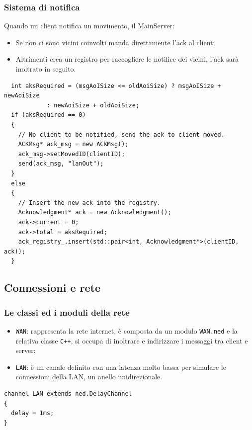 \begin{frame}[fragile]
\frametitle{Sistema di notifica}
\begin{block}{Quando un client notifica un movimento, il MainServer:}
\begin{itemize}
\item
Se non ci sono vicini coinvolti manda direttamente l'ack al client;
\item
Altrimenti crea un registro per raccogliere le notifice dei vicini, l'ack
sarà inoltrato in seguito.
\end{itemize}
\end{block}

\begin{lstlisting}
  int aksRequired = (msgAoISize <= oldAoiSize) ? msgAoISize + newAoiSize
            : newAoiSize + oldAoiSize;
  if (aksRequired == 0)
  {
    // No client to be notified, send the ack to client moved.
    ACKMsg* ack_msg = new ACKMsg();
    ack_msg->setMovedID(clientID);
    send(ack_msg, "lanOut");
  }
  else
  {
    // Insert the new ack into the registry.
    Acknowledgment* ack = new Acknowledgment();
    ack->current = 0;
    ack->total = aksRequired;
    ack_registry_.insert(std::pair<int, Acknowledgment*>(clientID, ack));
  }
\end{lstlisting}
\end{frame}


\subsection*{Connessioni e rete}

\begin{frame}[fragile]
\frametitle{Le classi ed i moduli della rete}
\begin{itemize}[<+->]
\item
\alert{\texttt{WAN}}:
rappresenta la rete internet, è composta da un modulo \texttt{WAN.ned} e
la relativa classe \texttt{C++}, si occupa di inoltrare e indirizzare i
messaggi tra client e server;
\item
\alert{\texttt{LAN}}:
è un canale definito con una latenza molto bassa per simulare le connessioni
della LAN, un anello unidirezionale.
\end{itemize}
\pause
\begin{lstlisting}[title = {DVESystem.ned}]
channel LAN extends ned.DelayChannel
{
  delay = 1ms;
}
\end{lstlisting}
\end{frame}

